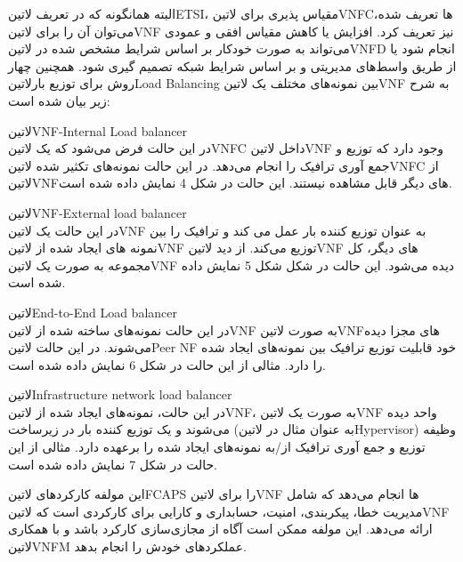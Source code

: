 البته همانگونه که در تعریف ‌لاتین{ETSI}، مقیاس پذیری برای ‌لاتین{VNFC}ها تعریف شده، می‌توان آن را برای ‌لاتین{VNF} نیز تعریف کرد.
افزایش یا کاهش مقیاس افقی و عمودی می‌تواند به صورت خودکار بر اساس شرایط مشخص شده در ‌لاتین{VNFD} انجام شود یا از طریق واسط‌های مدیریتی و بر اساس شرایط شبکه تصمیم گیری شود.
همچنین چهار روش برای توزیع بار‌لاتین{Load Balancing} بین نمونه‌های مختلف یک ‌لاتین{VNF} به شرح زیر بیان شده است:


 ‌لاتین{VNF-Internal Load balancer}\\
در این حالت فرض می‌شود که یک ‌لاتین{VNFC} داخل ‌لاتین{VNF} وجود دارد که توزیع و جمع آوری ترافیک را انجام می‌دهد.
در این حالت نمونه‌های تکثیر شده ‌لاتین{VNFC} از ‌لاتین{VNF}های دیگر قابل مشاهده نیستند. این حالت در شکل 4 نمایش داده شده است.

 ‌لاتین{VNF-External load balancer}\\
در این حالت یک ‌لاتین{VNF} به عنوان توزیع کننده بار عمل می کند و ترافیک را بین نمونه های ایجاد شده از ‌لاتین{VNF} توزیع می‌کند.
از دید ‌لاتین{VNF} های دیگر، کل مجموعه به صورت یک ‌لاتین{VNF} دیده می‌شود. این حالت در شکل شکل 5 نمایش داده شده است.

 ‌لاتین{End-to-End Load balancer}\\
در این حالت نمونه‌های ساخته شده از ‌لاتین{VNF} به صورت ‌لاتین{VNF}های مجزا دیده می‌شوند.
در این حالت ‌لاتین{Peer NF} خود قابلیت توزیع ترافیک بین نمونه‌های ایجاد شده را دارد. مثالی از این حالت در شکل 6 نمایش داده شده است.

 ‌لاتین{Infrastructure network load balancer}\\
در این حالت، نمونه‌های ایجاد شده از ‌لاتین{VNF}، به صورت یک ‌لاتین{VNF} واحد دیده می‌شوند
و یک توزیع کننده بار در زیرساخت (به عنوان مثال در ‌لاتین{Hypervisor}) وظیفه توزیع و جمع آوری ترافیک از/به نمونه‌های ایجاد شده را برعهده دارد.
مثالی از این حالت در شکل 7 نمایش داده شده است.



این مولفه کارکردهای ‌لاتین{FCAPS}
را برای ‌لاتین{VNF} ها انجام می‌دهد که شامل مدیریت خطا، پیکربندی، امنیت، حسابداری و کارایی برای کارکردی است که ‌لاتین{VNF} ارائه می‌دهد.
این مولفه ممکن است آگاه از مجازی‌سازی کارکرد باشد و با همکاری ‌لاتین{VNFM} عملکردهای خودش را انجام بدهد.

